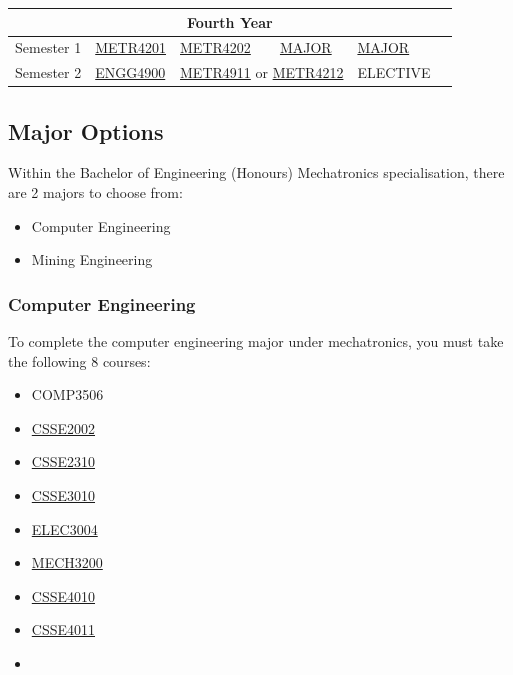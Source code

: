 \documentclass[a4paper,12pt]{report}
\begin{document}
\begin{table}[H]
    \centering
    \begin{tabular}{| m{6em} | m{5em} m{5em} m{5em} m{5em} m{5em} |}
        \hline
        \multicolumn{6}{|c|}{\bfseries Fourth Year} \\
        \hline
        Semester 1 & \hyperlink{METR4201}{METR4201} & \hyperlink{METR4202}{METR4202} & \hyperlink{MAJOR}{MAJOR} & \hyperlink{MAJOR}{MAJOR} & \\
        Semester 2 & \hyperlink{ENGG4900}{ENGG4900} & \multicolumn{2}{c}{\hyperlink{METR4911}{METR4911} or \hyperlink{METR4212}{METR4212}} & ELECTIVE & \\
        \hline
    \end{tabular}
\end{table}
\renewcommand{\arraystretch}{1}

\newpage

\hypertarget{MAJOR}{\subsection{Major Options}}
Within the Bachelor of Engineering (Honours) Mechatronics specialisation, there are 2 majors to choose from:
\begin{itemize}
    \item Computer Engineering
    \item Mining Engineering
\end{itemize}

\subsubsection{Computer Engineering}
To complete the computer engineering major under mechatronics, you must take the following 8 courses:
\begin{multicols}{3}
    \begin{itemize}
        \item COMP3506
        \item \hyperlink{CSSE2002}{CSSE2002}
        \item \hyperlink{CSSE2310}{CSSE2310}
        \item \hyperlink{CSSE3010}{CSSE3010}
        \item \hyperlink{ELEC3004}{ELEC3004}
        \item \hyperlink{MECH3200}{MECH3200}
        \item \hyperlink{CSSE4010}{CSSE4010}
        \item \hyperlink{CSSE4011}{CSSE4011}
        \item[]
    \end{itemize}
\end{multicols}
\end{document}
